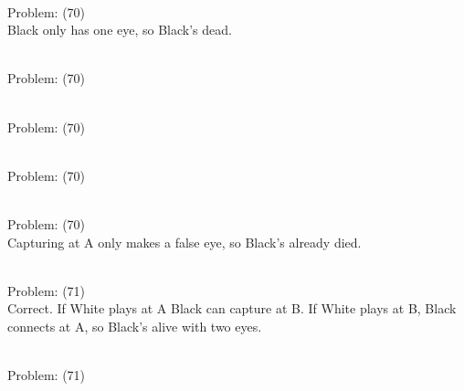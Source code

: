 \documentclass[11pt]{article}
\begin{document}
\begin{minipage}[t]{0.5\textwidth}
  {\centering
  
\\
Problem: (70)\\
Black only has one eye, so Black's dead.\\
  }
\end{minipage}
\begin{minipage}[t]{0.5\textwidth}
  {\centering
  
\\
Problem: (70)\\
  }
\end{minipage}
\begin{minipage}[t]{0.5\textwidth}
  {\centering
  
\\
Problem: (70)\\
  }
\end{minipage}
\begin{minipage}[t]{0.5\textwidth}
  {\centering
  
\\
Problem: (70)\\
  }
\end{minipage}
\begin{minipage}[t]{0.5\textwidth}
  {\centering
  
\\
Problem: (70)\\
Capturing at A only makes a false eye, so Black's already died.\\
  }
\end{minipage}
\begin{minipage}[t]{0.5\textwidth}
  {\centering
  
\\
Problem: (71)\\
Correct. If White plays at A Black can capture at B. If White plays at B, Black connects at A, so Black's alive with two eyes.\\
  }
\end{minipage}
\begin{minipage}[t]{0.5\textwidth}
  {\centering
  
\\
Problem: (71)\\
  }
\end{minipage}
\end{document}

